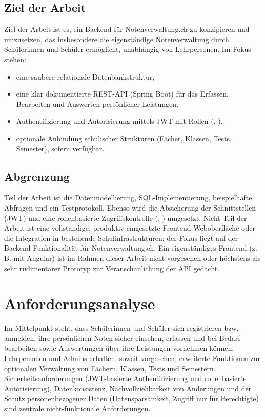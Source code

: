 \documentclass[12pt,a4paper]{article}
\newcommand{\code}[1]{\texttt{\detokenize{#1}}}
\begin{document}
    \subsection{Ziel der Arbeit}
    Ziel der Arbeit ist es, ein Backend für Notenverwaltung.ch zu konzipieren und umzusetzen,
    das insbesondere die eigenständige Notenverwaltung durch Schülerinnen und Schüler ermöglicht, unabhängig von Lehrpersonen. Im Fokus stehen:
    \begin{itemize}
        \item eine saubere relationale Datenbankstruktur,
        \item eine klar dokumentierte REST-API (Spring Boot) für das Erfassen, Bearbeiten und Auswerten persönlicher Leistungen,
        \item Authentifizierung und Autorisierung mittels JWT mit Rollen (\code{USER}, \code{ADMIN}),
        \item optionale Anbindung schulischer Strukturen (Fächer, Klassen, Tests, Semester), sofern verfügbar.
    \end{itemize}

    \subsection{Abgrenzung}
    Teil der Arbeit ist die Datenmodellierung, SQL-Implementierung, beispielhafte Abfragen und ein Testprotokoll.
    Ebenso wird die Absicherung der Schnittstellen (JWT) und eine rollenbasierte Zugriffskontrolle
    (\code{USER}, \code{ADMIN}) umgesetzt. Nicht Teil der Arbeit ist eine vollständige,
    produktiv eingesetzte Frontend-Weboberfläche oder die Integration in bestehende Schulinfrastrukturen; der Fokus
    liegt auf der Backend-Funktionalität für Notenverwaltung.ch. Ein eigenständiges Frontend (z. B. mit Angular) ist
    im Rahmen dieser Arbeit nicht vorgesehen oder höchstens als sehr rudimentärer Prototyp zur Veranschaulichung der API gedacht.



    \section{Anforderungsanalyse}
    Im Mittelpunkt steht, dass Schülerinnen und Schüler sich registrieren bzw. anmelden, ihre persönlichen Noten sicher einsehen,
    erfassen und bei Bedarf bearbeiten sowie Auswertungen über ihre Leistungen vornehmen können.
    Lehrpersonen und Admins erhalten, soweit vorgesehen, erweiterte Funktionen zur optionalen Verwaltung von Fächern, Klassen, Tests und Semestern.
    Sicherheitsanforderungen (JWT-basierte Authentifizierung und rollenbasierte Autorisierung), Datenkonsistenz, Nachvollziehbarkeit von Änderungen
    und der Schutz personenbezogener Daten (Datensparsamkeit, Zugriff nur für Berechtigte) sind zentrale nicht‑funktionale Anforderungen.
\end{document}
